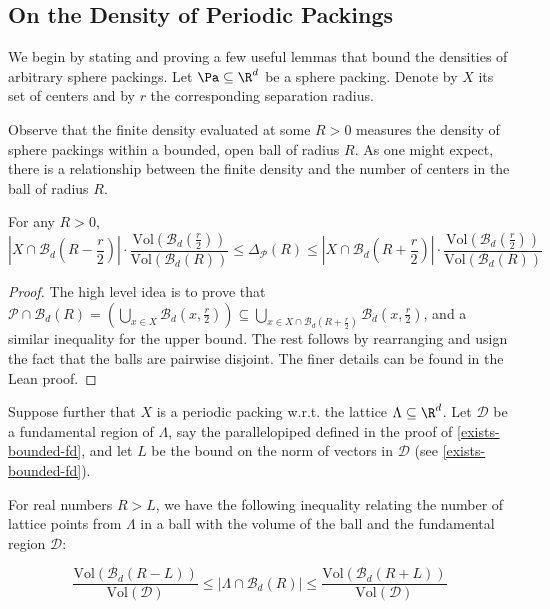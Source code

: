 \subsection{On the Density of Periodic Packings}

We begin by stating and proving a few useful lemmas that bound the densities of arbitrary sphere packings. Let $\Pa \subseteq \R^d$ be a sphere packing. Denote by $X$ its set of centers and by $r$ the corresponding separation radius.

Observe that the finite density evaluated at some $R > 0$ measures the density of sphere packings within a bounded, open ball of radius $R$. As one might expect, there is a relationship between the finite density and the number of centers in the ball of radius $R$.
\begin{lemma}\label{SpherePacking.finiteDensity_le_ge}\leanok
  For any $R > 0$,
  \[
    \left|X \cap \mathcal{B}_d\left(R - \frac{r}{2}\right)\right| \cdot \frac{\mathrm{Vol}\left(\mathcal{B}_d\left(\frac{r}{2}\right)\right)}{\mathrm{Vol}(\mathcal{B}_d(R))}
    \leq \Delta_{\mathcal{P}}(R)
    \leq \left|X \cap \mathcal{B}_d\left(R + \frac{r}{2}\right)\right| \cdot \frac{\mathrm{Vol}\left(\mathcal{B}_d\left(\frac{r}{2}\right)\right)}{\mathrm{Vol}(\mathcal{B}_d(R))}
  \]
\end{lemma}
\begin{proof}\leanok
  The high level idea is to prove that $\mathcal{P} \cap \mathcal{B}_d(R) = \left(\bigcup_{x \in X} \mathcal{B}_d\left(x, \frac{r}{2}\right)\right) \subseteq \bigcup_{x \in X \cap \mathcal{B}_d\left(R + \frac{r}{2}\right)} \mathcal{B}_d\left(x, \frac{r}{2}\right)$, and a similar inequality for the upper bound. The rest follows by rearranging and usign the fact that the balls are pairwise disjoint. The finer details can be found in the Lean proof.
\end{proof}

Suppose further that $X$ is a periodic packing w.r.t. the lattice $\Lambda \subseteq \R^d$. Let $\mathcal{D}$ be a fundamental region of $\Lambda$, say the parallelopiped defined in the proof of \cref{exists-bounded-fd}, and let $L$ be the bound on the norm of vectors in $\mathcal{D}$ (see \cref{exists-bounded-fd}).

\begin{theorem}\label{lattice-points-bounds}
  For real numbers $R > L$, we have the following inequality relating the number of lattice points from $\Lambda$ in a ball with the volume of the ball and the fundamental region $\mathcal{D}$:

  \[
    \frac{\mathrm{Vol}(\mathcal{B}_d(R - L))}{\mathrm{Vol}(\mathcal{D})}
    \leq \left|\Lambda \cap \mathcal{B}_d(R)\right|
    \leq \frac{\mathrm{Vol}(\mathcal{B}_d(R + L))}{\mathrm{Vol}(\mathcal{D})}
  \]
\end{theorem}

